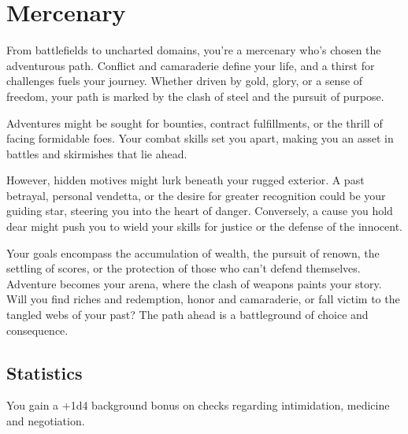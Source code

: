 \section{Mercenary}\label{background:mercenary}
From battlefields to uncharted domains, you're a mercenary who's chosen the adventurous path.
Conflict and camaraderie define your life, and a thirst for challenges fuels your journey.
Whether driven by gold, glory, or a sense of freedom, your path is marked by the clash of steel and the pursuit of purpose.

Adventures might be sought for bounties, contract fulfillments, or the thrill of facing formidable foes.
Your combat skills set you apart, making you an asset in battles and skirmishes that lie ahead.

However, hidden motives might lurk beneath your rugged exterior.
A past betrayal, personal vendetta, or the desire for greater recognition could be your guiding star, steering you into the heart of danger.
Conversely, a cause you hold dear might push you to wield your skills for justice or the defense of the innocent.

Your goals encompass the accumulation of wealth, the pursuit of renown, the settling of scores, or the protection of those who can't defend themselves.
Adventure becomes your arena, where the clash of weapons paints your story.
Will you find riches and redemption, honor and camaraderie, or fall victim to the tangled webs of your past?
The path ahead is a battleground of choice and consequence.

\subsection{Statistics}
You gain a +1d4 background bonus on checks regarding intimidation, medicine and negotiation.
